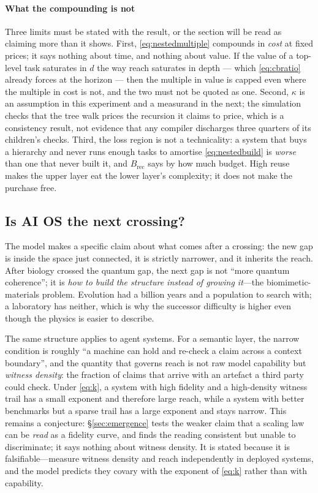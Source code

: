\documentclass[conference]{IEEEtran}
\theoremstyle{definition}
\begin{document}
\paragraph{What the compounding is not} Three limits must be stated with the
result, or the section will be read as claiming more than it shows. First,
\eqref{eq:nestedmultiple} compounds in \emph{cost} at fixed prices; it says
nothing about time, and nothing about value. If the value of a top-level task
saturates in $d$ the way reach saturates in depth --- which
\eqref{eq:cbratio} already forces at the horizon --- then the multiple in value is
capped even where the multiple in cost is not, and the two must not be quoted as
one. Second, $\kappa$ is an assumption in this experiment and a measurand in the
next; the simulation checks that the tree walk prices the recursion it claims to
price, which is a consistency result, not evidence that any compiler discharges
three quarters of its children's checks. Third, the loss region is not a
technicality: a system that buys a hierarchy and never runs enough tasks to
amortise \eqref{eq:nestedbuild} is \emph{worse} than one that never built it, and
$B_{\text{rec}}$ says by how much budget. High reuse makes the upper layer eat the
lower layer's complexity; it does not make the purchase free.

\subsection{Is AI OS the next crossing?}

The model makes a specific claim about what comes after a crossing: the new gap is
inside the space just connected, it is strictly narrower, and it inherits the reach.
After biology crossed the quantum gap, the next gap is not ``more quantum
coherence''; it is \emph{how to build the structure instead of growing it}---the
biomimetic-materials problem. Evolution had a billion years and a population to
search with; a laboratory has neither, which is why the successor difficulty is
higher even though the physics is easier to describe.

The same structure applies to agent systems. For a semantic layer, the narrow
condition is roughly ``a machine can hold and re-check a claim across a context
boundary'', and the quantity that governs reach is not raw model capability but
\emph{witness density}: the fraction of claims that arrive with an artefact a third
party could check. Under \eqref{eq:k}, a system with high fidelity and a
high-density witness trail has a small exponent and therefore large reach, while a
system with better benchmarks but a sparse trail has a large exponent and stays
narrow. This remains a conjecture: \S\ref{sec:emergence} tests the weaker claim that
a scaling law can be \emph{read} as a fidelity curve, and finds the reading
consistent but unable to discriminate; it says nothing about witness density. It is
stated because it is falsifiable---measure witness density and reach
independently in deployed systems, and the model predicts they covary with the
exponent of \eqref{eq:k} rather than with capability.
\end{document}

